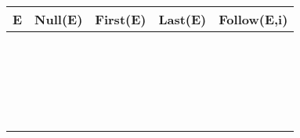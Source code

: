 \documentclass[11pt]{article}
\begin{document}
\begin{table}[H]
{\small
\begin{tabular}{|c||c|c|c|c|}
\hline
\bf{E}&\bf{Null(E)}&\bf{First(E)}&\bf{Last(E)}&\bf{Follow}(E,i)\\
\hline
\hline
\bf{} &&&&\\
\hline
\bf{}&&&&\\
\hline
\bf{}&&&&\\
\hline
\bf{}&&&&\\
\hline
\bf{}&&&&\\
\hline
\bf{}&\begin{minipage}{1.8cm}\begin{center}\\\\\end{center}\end{minipage}&\begin{minipage}
{2.7cm}\begin{center}\\\\\end{center}\end{minipage}&\begin{minipage}{2.5cm}\begin{center}\\\\\end{center}\end{minipage}&\begin{minipage}{3.7cm}\begin{center}\\\\\end{center}\end{minipage}\\
\hline
\bf{}&\begin{minipage}{1.8cm}\begin{center}\\\\\end{center}\end{minipage}
&\begin{minipage}{2.7cm}\begin{center} \\ \\ \end{center}\end{minipage}&\begin{minipage}
{2.5cm}\begin{center}\\  \\ \end{center}\end{minipage}&\begin{minipage}{3.7cm}

\end{minipage}
\end{tabular}}
\end{table}
\end{document}
